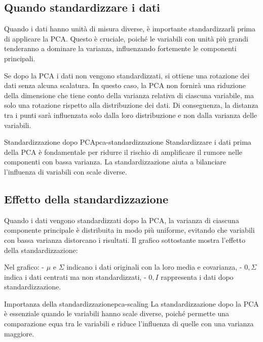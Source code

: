 \subsection{Quando standardizzare i dati}

Quando i dati hanno unità di misura diverse, è importante standardizzarli
prima di applicare la PCA. Questo è cruciale, poiché le variabili con unità
più grandi tenderanno a dominare la varianza, influenzando fortemente le
componenti principali.

Se dopo la PCA i dati non vengono standardizzati, si ottiene una rotazione dei
dati senza alcuna scalatura. In questo caso, la PCA non fornirà una riduzione
della dimensione che tiene conto della varianza relativa di ciascuna variabile,
ma solo una rotazione rispetto alla distribuzione dei dati. Di conseguenza, la
distanza tra i punti sarà influenzata solo dalla loro distribuzione e non dalla
varianza delle variabili.

\begin{nota}{Standardizzazione dopo PCA}{pca-standardizzazione}
Standardizzare i dati prima della PCA è fondamentale per ridurre il rischio di
amplificare il rumore nelle componenti con bassa varianza. La standardizzazione
aiuta a bilanciare l'influenza di variabili con scale diverse.
\end{nota}

\subsection{Effetto della standardizzazione}

Quando i dati vengono standardizzati dopo la PCA, la varianza di ciascuna
componente principale è distribuita in modo più uniforme, evitando che
variabili con bassa varianza distorcano i risultati. Il grafico sottostante
mostra l'effetto della standardizzazione:

Nel grafico:
- \( \mu \) e \( \Sigma \) indicano i dati originali con la loro media e
covarianza,
- \( 0, \Sigma \) indica i dati centrati ma non standardizzati,
- \( 0, I \) rappresenta i dati dopo standardizzazione.

\begin{nota}{Importanza della standardizzazione}{pca-scaling}
La standardizzazione dopo la PCA è essenziale quando le variabili hanno scale
diverse, poiché permette una comparazione equa tra le variabili e riduce
l'influenza di quelle con una varianza maggiore.
\end{nota}


